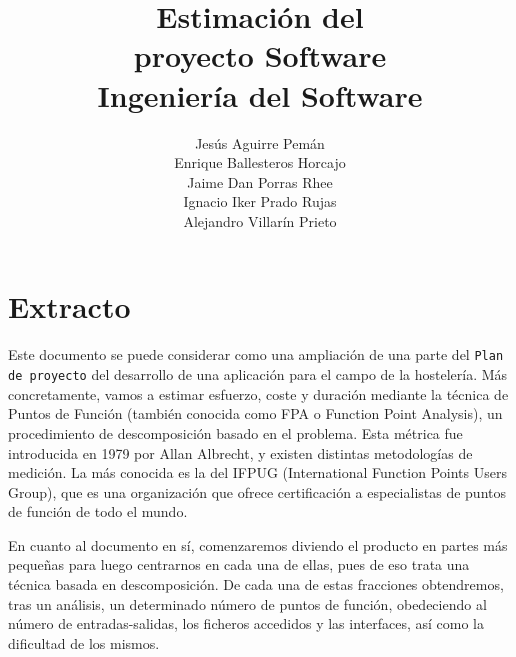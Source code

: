 \documentclass[spanish,a4paper,12pt]{report}	%
\begin{document}
\title{\textbf{\huge{Estimación del \\ 
	proyecto Software}} \\ \vspace{0.3cm}
	\Large{Ingeniería del Software}}
\author{ Jesús Aguirre Pemán \\
	 Enrique Ballesteros Horcajo \\
	 Jaime Dan Porras Rhee \\
	 Ignacio Iker Prado Rujas \\
	 Alejandro Villarín Prieto }
\date{\Today}
\maketitle

\newpage
\mbox{}
\thispagestyle{empty}						%
\newpage


\tableofcontents 							%

\newpage
\mbox{}
\thispagestyle{empty}						%
\newpage


\part{Extracto} %
Este documento se puede considerar como una ampliación de una parte del \texttt{Plan de proyecto} del desarrollo de una aplicación para el campo de la hostelería. Más concretamente, vamos a estimar esfuerzo, coste y duración mediante la técnica de Puntos de Función (también conocida como FPA o Function Point Analysis), un procedimiento de descomposición basado en el problema. Esta métrica fue introducida en 1979 por Allan Albrecht, y existen distintas metodologías de medición. La más conocida es la del IFPUG (International Function Points Users Group), que es una organización que ofrece certificación a especialistas de puntos de función de todo el mundo. 

\vspace{0.35cm}

En cuanto al documento en sí, comenzaremos diviendo el producto en partes más pequeñas para luego centrarnos en cada una de ellas, pues de eso trata una técnica basada en descomposición. De cada una de estas fracciones obtendremos, tras un análisis, un determinado número de puntos de función, obedeciendo al número de entradas-salidas, los ficheros accedidos y las interfaces, así como la dificultad de los mismos. 
\end{document}

